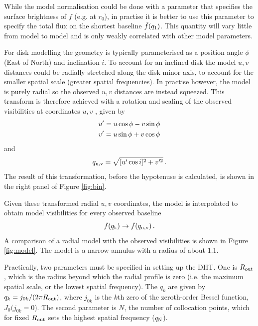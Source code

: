 \documentclass[fleqn,usenatbib]{mnras}
\begin{document}
While the model normalisation could be done with a parameter that specifies the surface brightness of $f$ (e.g. at $r_0$), in practise it is better to use this parameter to specify the total flux on the shortest baseline $\Tilde{f}(q_1)$. This quantity will vary little from model to model and is only weakly correlated with other model parameters.

For disk modelling the geometry is typically parameterised as a position angle $\phi$ (East of North) and inclination $i$. To account for an inclined disk the model $u,v$ distances could be radially stretched along the disk minor axis, to account for the smaller spatial scale (greater spatial frequencies). In practise however, the model is purely radial so the observed $u,v$ distances are instead squeezed. This transform is therefore achieved with a rotation and scaling of the observed visibilities at coordinates $u,v$ \citep[e.g. as in][]{2018MNRAS.476.4527T}, given by
\begin{gather}
    u' = u \cos \phi - v \sin \phi \notag \\
    v' = u \sin \phi + v \cos \phi
\end{gather}
and 
\begin{equation}
    q_{\rm u,v} = \sqrt{[u' \cos i]^2 + v'^2} \, .
\end{equation}
The result of this transformation, before the hypotenuse is calculated, is shown in the right panel of Figure \ref{fig:bin}.

Given these transformed radial $u,v$ coordinates, the model is interpolated to obtain model visibilities for every observed baseline
\begin{equation}
    \Tilde{f}(q_{\rm k}) \rightarrow \Tilde{f}(q_{\rm u,v}) \, .
\end{equation}
A comparison of a radial model with the observed visibilities is shown in Figure \ref{fig:model}. The model is a narrow annulus with a radius of about 1.1\arcsec.

Practically, two parameters must be specified in setting up the DHT. One is $R_{\rm out}$, which is the radius beyond which the radial profile is zero (i.e. the maximum spatial scale, or the lowest spatial frequency). The $q_k$ are given by $q_k = j_{0k}/(2 \pi R_{\rm out})$, where $j_{0k}$ is the $k$th zero of the zeroth-order Bessel function, $J_0(j_{0k}=0$). The second parameter is $N$, the number of collocation points, which for fixed $R_{\rm out}$ sets the highest spatial frequency ($q_{\rm N}$). 
\end{document}
